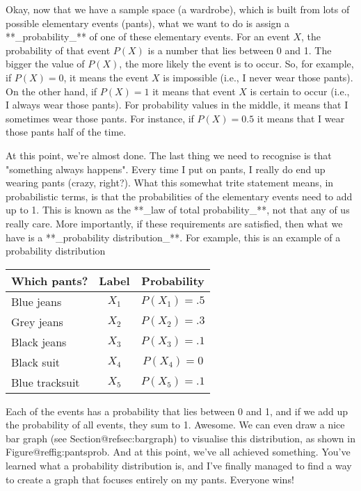 Okay, now that we have a sample space (a wardrobe), which is built from lots of possible elementary events (pants), what we want to do is assign a **_probability_** of one of these elementary events. For an event $X$, the probability of that event $P(X)$ is a number that lies between 0 and 1. The bigger the value of $P(X)$, the more likely the event is to occur. So, for example, if $P(X) = 0$, it means the event $X$ is impossible (i.e., I never wear those pants). On the other hand, if $P(X) = 1$ it means that event $X$ is certain to occur (i.e., I always wear those pants). For probability values in the middle, it means that I sometimes wear those pants. For instance, if $P(X) = 0.5$ it means that I wear those pants half of the time. 

At this point, we're almost done. The last thing we need to recognise is that "something always happens". Every time I put on pants, I really do end up wearing pants (crazy, right?). What this somewhat trite statement means, in probabilistic terms, is that the probabilities of the elementary events need to add up to 1. This is known as the **_law of total probability_**, not that any of us really care. More importantly, if these requirements are satisfied, then what we have is a **_probability distribution_**. For example, this is an example of a probability distribution
\begin{center}
\begin{tabular}{lcc} 
Which pants?     &  Label & Probability \\ \hline
Blue jeans &  $X_1$ & $P(X_1) = .5 $ \\
Grey jeans  &  $X_2$ & $P(X_2) = .3 $ \\
Black jeans      &  $X_3$ & $P(X_3) = .1 $ \\
Black suit       &  $X_4$ & $P(X_4) = 0  $ \\
Blue tracksuit  &  $X_5$ & $P(X_5) = .1 $ \\
\end{tabular}
\end{center}
Each of the events has a probability that lies between 0 and 1, and if we add up the probability of all events, they sum to 1. Awesome. We can even draw a nice bar graph (see Section@refsec:bargraph) to visualise this distribution, as shown in Figure@reffig:pantsprob. And at this point, we've all achieved something. You've learned what a probability distribution is, and I've finally managed to find a way to create a graph that focuses entirely on my pants. Everyone wins!

